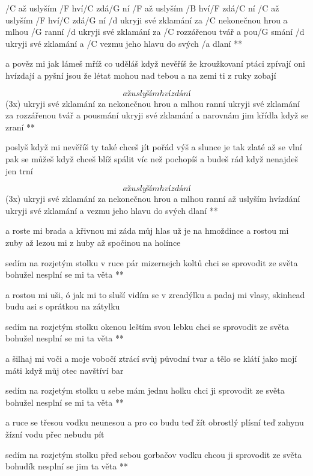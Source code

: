 \R /C až uslyším /F hví/C zdá/G ní
   /F až uslyším /B hví/F zdá/C ní
   /C až uslyším /F hví/C zdá/G ní
   /d ukryji své zklamání za /C nekonečnou hrou a mlhou /G ranní
   /d ukryji své zklamání za /C rozzářenou tvář a pou/G smání
   /d ukryji své zklamání a /C vezmu jeho hlavu do svých /a dlaní **

a pověz mi jak lámeš mříž co uděláš když nevěříš
že kroužkovaní ptáci zpívají
oni hvízdají a pyšní jsou že létat mohou nad tebou
a na zemi ti z ruky zobají \s

\R \[ až uslyším hvízdání \] (3x)
   ukryji své zklamání za nekonečnou hrou a mlhou ranní
   ukryji své zklamání za rozzářenou tvář a pousmání
   ukryji své zklamání a narovnám jim křídla když se zraní **

poslyš když mi nevěříš ty také chceš jít pořád výš
a slunce je tak zlaté až se vlní
pak se můžeš když chceš blíž spálit víc než pochopíš
a budeš rád když nenajdeš jen trní \s

\R \[ až uslyším hvízdání \] (3x)
   ukryji své zklamání za nekonečnou hrou a mlhou ranní
   až uslyším hvízdání
   ukryji své zklamání a vezmu jeho hlavu do svých dlaní **




a roste mi brada a křivnou mi záda
můj hlas už je na hmoždince
a rostou mi zuby až lezou mi z huby
až spočinou na holínce \s

\R sedím na rozjetým stolku
   v ruce pár mizernejch koltů
   chci se sprovodit ze světa
   bohužel nesplní se mi ta věta **

a rostou mi uši, ó jak mi to sluší
vidím se v zrcadýlku
a padaj mi vlasy, skinhead budu asi
s oprátkou na zátylku \s

\R sedím na rozjetým stolku
   okenou leštím svou lebku
   chci se sprovodit ze světa
   bohužel nesplní se mi ta  věta **

a šilhaj mi voči a moje vobočí
ztrácí svůj původní tvar
a tělo se klátí jako mojí máti
když můj otec navštíví bar \s

\R sedím na rozjetým stolku
   u sebe mám jednu holku
   chci ji sprovodit ze světa
   bohužel nesplní se mi ta věta **

a ruce se třesou vodku neunesou
a pro co budu teď žít
obrostlý plísní teď zahynu žízní
vodu přec nebudu pít \s

\R sedím na rozjetým stolku
   před sebou gorbačov vodku
   chcou ji sprovodit ze světa
   bohudík nesplní se jim ta věta **

